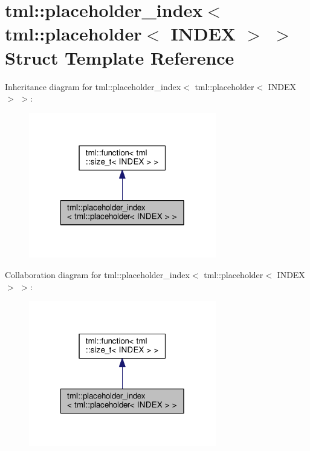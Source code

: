 \hypertarget{structtml_1_1placeholder__index_3_01tml_1_1placeholder_3_01_i_n_d_e_x_01_4_01_4}{\section{tml\+:\+:placeholder\+\_\+index$<$ tml\+:\+:placeholder$<$ I\+N\+D\+E\+X $>$ $>$ Struct Template Reference}
\label{structtml_1_1placeholder__index_3_01tml_1_1placeholder_3_01_i_n_d_e_x_01_4_01_4}
}


Inheritance diagram for tml\+:\+:placeholder\+\_\+index$<$ tml\+:\+:placeholder$<$ I\+N\+D\+E\+X $>$ $>$\+:
\nopagebreak
\begin{figure}[H]
\begin{center}
\leavevmode
\includegraphics[width=232pt]{structtml_1_1placeholder__index_3_01tml_1_1placeholder_3_01_i_n_d_e_x_01_4_01_4__inherit__graph}
\end{center}
\end{figure}


Collaboration diagram for tml\+:\+:placeholder\+\_\+index$<$ tml\+:\+:placeholder$<$ I\+N\+D\+E\+X $>$ $>$\+:
\nopagebreak
\begin{figure}[H]
\begin{center}
\leavevmode
\includegraphics[width=232pt]{structtml_1_1placeholder__index_3_01tml_1_1placeholder_3_01_i_n_d_e_x_01_4_01_4__coll__graph}
\end{center}
\end{figure}
